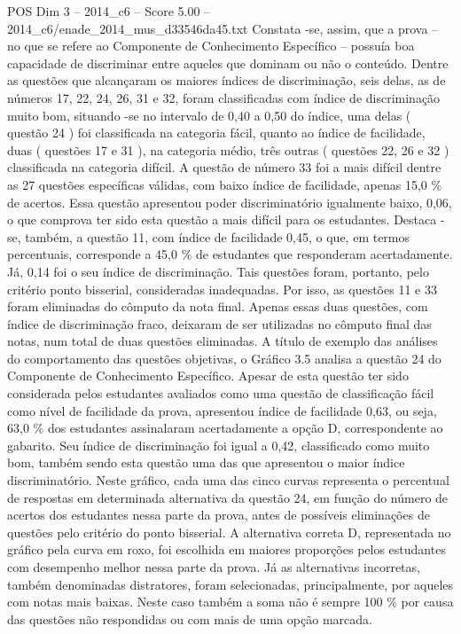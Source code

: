 \begin{textsample}{POS Dim 3 – 2014\_c6 – Score 5.00 – 2014\_c6/enade\_2014\_mus\_d33546da45.txt}
Constata -se, assim, que a prova – no que se refere ao Componente de Conhecimento Específico – possuía boa capacidade de discriminar entre aqueles que dominam ou não o conteúdo.
Dentre as questões que alcançaram os maiores índices de discriminação, seis delas, as de números 17, 22, 24, 26, 31 e 32, foram classificadas com índice de discriminação muito bom, situando -se no intervalo de 0,40 a 0,50 do índice, uma delas ( questão 24 ) foi classificada na categoria fácil, quanto ao índice de facilidade, duas ( questões 17 e 31 ), na categoria médio, três outras ( questões 22, 26 e 32 ) classificada na categoria difícil.
A questão de número 33 foi a mais difícil dentre as 27 questões específicas válidas, com baixo índice de facilidade, apenas 15,0 \% de acertos.
Essa questão apresentou poder discriminatório igualmente baixo, 0,06, o que comprova ter sido esta questão a mais difícil para os estudantes.
Destaca -se, também, a questão 11, com índice de facilidade 0,45, o que, em termos percentuais, corresponde a 45,0 \% de estudantes que responderam acertadamente.
Já, 0,14 foi o seu índice de discriminação.
Tais questões foram, portanto, pelo critério ponto bisserial, consideradas inadequadas.
Por isso, as questões 11 e 33 foram eliminadas do cômputo da nota final.
Apenas essas duas questões, com índice de discriminação fraco, deixaram de ser utilizadas no cômputo final das notas, num total de duas questões eliminadas.
A título de exemplo das análises do comportamento das questões objetivas, o Gráfico 3.5 analisa a questão 24 do Componente de Conhecimento Específico.
Apesar de esta questão ter sido considerada pelos estudantes avaliados como uma questão de classificação fácil como nível de facilidade da prova, apresentou índice de facilidade 0,63, ou seja, 63,0 \% dos estudantes assinalaram acertadamente a opção D, correspondente ao gabarito.
Seu índice de discriminação foi igual a 0,42, classificado como muito bom, também sendo esta questão uma das que apresentou o maior índice discriminatório.
Neste gráfico, cada uma das cinco curvas representa o percentual de respostas em determinada alternativa da questão 24, em função do número de acertos dos estudantes nessa parte da prova, antes de possíveis eliminações de questões pelo critério do ponto bisserial.
A alternativa correta D, representada no gráfico pela curva em roxo, foi escolhida em maiores proporções pelos estudantes com desempenho melhor nessa parte da prova.
Já as alternativas incorretas, também denominadas distratores, foram selecionadas, principalmente, por aqueles com notas mais baixas.
Neste caso também a soma não é sempre 100 \% por causa das questões não respondidas ou com mais de uma opção marcada.

\end{textsample}
